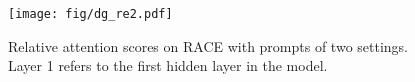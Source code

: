 \begin{figure}[ht] %
\centering %
\texttt{[image: fig/dg\_re2.pdf]} 
\caption{Relative attention scores on RACE with prompts of two settings. Layer 1 refers to the first hidden layer in the model.} %
\label{fig/dg_re} %
\end{figure}